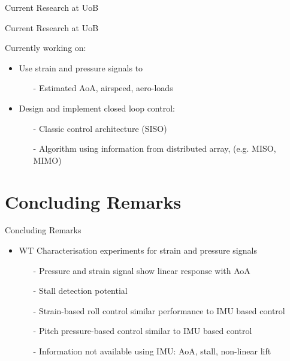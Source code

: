 \documentclass[aspectratio=169]{beamer}            %
\begin{document}
\begin{frame}{Current Research at UoB}
\end{frame}

\begin{frame}{Current Research at UoB}

	Currently working on:
  \pause
  \begin{itemize}[<+->]
    \item{Use strain and pressure signals to}
			\begin{itemize}[<+->]
			  \item[-]{Estimated AoA, airspeed, aero-loads}
			\end{itemize}
		\item{Design and implement closed loop control:}
			\begin{itemize}[<+->]
			  \item[-]{Classic control architecture (SISO)}
        \item[-]{Algorithm using information from distributed array, (e.g. MISO, MIMO)}
			\end{itemize}
  \end{itemize}

\end{frame}

\section{Concluding Remarks}
\begin{frame}{Concluding Remarks}

  \pause
  \begin{itemize}[<+->]
    \item WT Characterisation experiments for strain and pressure signals
		  \begin{itemize}[<+->]
			  \item[-]{Pressure and strain signal show linear response with AoA}
        \item[-]{Stall detection potential}
				\item[-]{Strain-based roll control similar performance to IMU based control}
        \item[-]{Pitch pressure-based control similar to IMU based control}
			  \item[-]{Information not available using IMU: AoA, stall, non-linear lift}
			\end{itemize}
  \end{itemize}
	
\end{frame}
\end{document}

